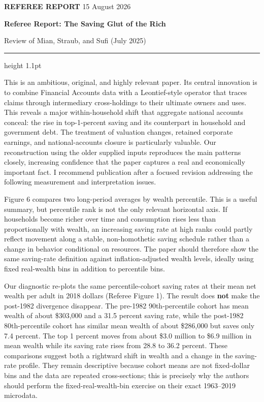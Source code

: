 {\color{MSSOrange}\bfseries\small REFEREE REPORT}\hfill
{\color{MSSGray}\small 15 August 2026}\par
{\color{MSSNavy}\bfseries\LARGE Referee Report: The Saving Glut of the Rich}\par
{\color{MSSGray}\small Review of Mian, Straub, and Sufi (July 2025)}
\vspace{0.25em}\hrule height 1.1pt\vspace{0.35em}

This is an ambitious, original, and highly relevant paper. Its central
innovation is to combine Financial Accounts data with a Leontief-style
operator that traces claims through intermediary cross-holdings to their
ultimate owners and uses. This reveals a major within-household shift that
aggregate national accounts conceal: the rise in top-1-percent saving and its
counterpart in household and government debt. The treatment of valuation
changes, retained corporate earnings, and national-accounts closure is
particularly valuable. Our reconstruction using the older supplied inputs
reproduces the main patterns closely, increasing confidence that the paper
captures a real and economically important fact. I recommend publication after
a focused revision addressing the following measurement and interpretation
issues.


Figure 6 compares two long-period averages by wealth percentile. This is a
useful summary, but percentile rank is not the only relevant horizontal axis.
If households become richer over time and consumption rises less than
proportionally with wealth, an increasing saving rate at high ranks could
partly reflect movement along a stable, non-homothetic saving schedule rather
than a change in behavior conditional on resources. The paper should therefore
show the same saving-rate definition against inflation-adjusted wealth levels,
ideally using fixed real-wealth bins in addition to percentile bins.

Our diagnostic re-plots the same percentile-cohort saving rates at their mean
net wealth per adult in 2018 dollars (Referee Figure 1). The result does
\textbf{not} make the post-1982 divergence disappear. The pre-1982
90th-percentile cohort has mean wealth of about \$303,000 and a 31.5 percent
saving rate, while the post-1982 80th-percentile cohort has similar mean wealth
of about \$286,000 but saves only 7.4 percent. The top 1 percent moves from
about \$3.0 million to \$6.9 million in mean wealth while its saving rate rises
from 28.8 to 36.2 percent. These comparisons suggest both a rightward shift in
wealth and a change in the saving-rate profile. They remain descriptive because
cohort means are not fixed-dollar bins and the data are repeated
cross-sections; this is precisely why the authors should perform the
fixed-real-wealth-bin exercise on their exact 1963--2019 microdata.

